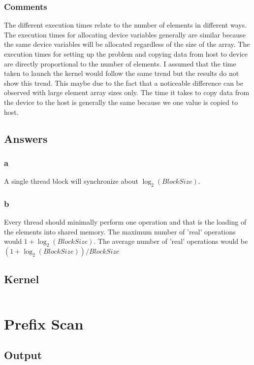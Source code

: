 \documentclass{article}
\begin{document}
\subsubsection{Comments} 
 The different execution times relate to the number of elements in different ways. The execution times for allocating device variables generally are similar because the same device variables will be allocated regardless of the size of the array. The execution times for setting up the problem and  copying data from host to device are directly proportional to the number of elements. I assumed that the time taken to launch the kernel would follow the same trend but the results do not show this trend. This maybe due to the fact that a noticeable difference can be observed with large element array sizes only. The time it takes to copy data from the device to the host is generally the same because we one value is copied to host. 
 
\subsection{Answers}
\subsubsection{a}
A single thread block will synchronize about $\log_2(Block Size)$. 
\subsubsection{b}
Every thread should minimally perform one operation and that is the loading of the elements into shared memory. The maximum number of 'real' operations would $1 + \log_2(Block Size)$. The average number of 'real' operations would  be $(1 + \log_2(Block Size))/ Block Size$
  
\subsection{Kernel}
\inputminted[breaklines, linenos]{c}{./reduction-kernel.cu}
 
\section{Prefix Scan}
\subsection{Output}
\end{document}
